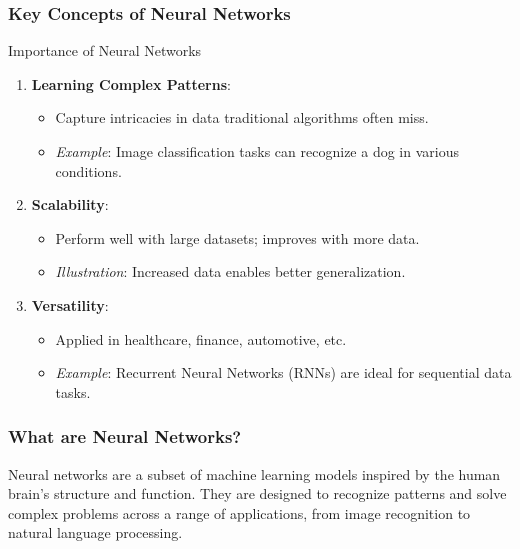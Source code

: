 \documentclass[aspectratio=169]{beamer}
\begin{document}
\begin{frame}[fragile]
    \frametitle{Key Concepts of Neural Networks}
    \begin{block}{Importance of Neural Networks}
        \begin{enumerate}
            \item \textbf{Learning Complex Patterns}:
            \begin{itemize}
                \item Capture intricacies in data traditional algorithms often miss.
                \item \textit{Example}: Image classification tasks can recognize a dog in various conditions.
            \end{itemize}
            \item \textbf{Scalability}:
            \begin{itemize}
                \item Perform well with large datasets; improves with more data.
                \item \textit{Illustration}: Increased data enables better generalization.
            \end{itemize}
            \item \textbf{Versatility}:
            \begin{itemize}
                \item Applied in healthcare, finance, automotive, etc.
                \item \textit{Example}: Recurrent Neural Networks (RNNs) are ideal for sequential data tasks.
            \end{itemize}
        \end{enumerate}
    \end{block}
\end{frame}

\begin{frame}[fragile]
    \frametitle{What are Neural Networks?}
    Neural networks are a subset of machine learning models inspired by the human brain's structure and function. 
    They are designed to recognize patterns and solve complex problems across a range of applications, from image recognition to natural language processing.
\end{frame}
\end{document}
